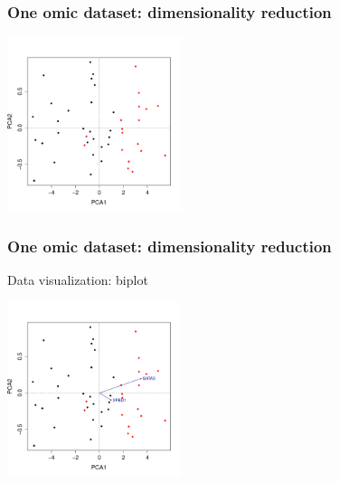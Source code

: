 \documentclass[10pt,xcolor=dvipsnames]{beamer}\usepackage[]{graphicx}\usepackage[]{color}
\newenvironment{knitrout}{}{} %
\begin{document}
\begin{frame}[fragile]\frametitle{One omic dataset: dimensionality reduction}

\begin{knitrout}\footnotesize
{}\color{fgcolor}

{\centering \includegraphics[width=2in]{figure/plot_pca_4-1} 

}



\end{knitrout}

\end{frame}


\begin{frame}[fragile]\frametitle{One omic dataset: dimensionality reduction}

Data visualization: biplot

\begin{knitrout}\footnotesize
{}\color{fgcolor}

{\centering \includegraphics[width=2in]{figure/plot_pca_5-1} 

}



\end{knitrout}

\end{frame}
\end{document}
